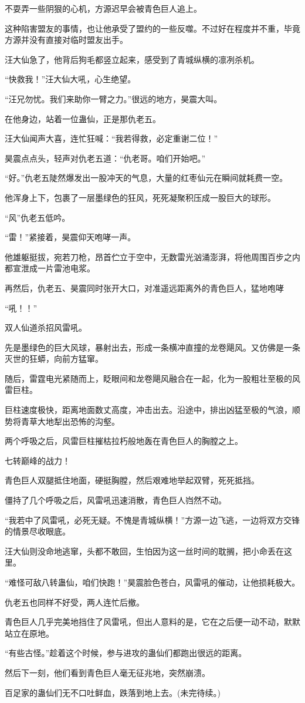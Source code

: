 \begin{this_body}
不耍弄一些阴狠的心机，方源迟早会被青色巨人追上。

这种陷害盟友的事情，也让他承受了盟约的一些反噬。不过好在程度并不重，毕竟方源并没有直接对临时盟友出手。

汪大仙急了，他背后狗毛都竖立起来，感受到了青城纵横的凛冽杀机。

“快救我！”汪大仙大吼，心生绝望。

“汪兄勿忧。我们来助你一臂之力。”很远的地方，昊震大叫。

在他身边，站着一位蛊仙，正是那仇老五。

汪大仙闻声大喜，连忙狂喊：“我若得救，必定重谢二位！”

昊震点点头，轻声对仇老五道：“仇老哥。咱们开始吧。”

“好。”仇老五陡然爆发出一股冲天的气息，大量的红枣仙元在瞬间就耗费一空。

他浑身上下，包裹了一层墨绿色的狂风，死死凝聚积压成一股巨大的球形。

“风”仇老五低吟。

“雷！”紧接着，昊震仰天咆哮一声。

他雄躯挺拔，宛若刀枪，昂首伫立于空中，无数雷光汹涌澎湃，将他周围百步之内都宣泄成一片雷池电浆。

再然后，仇老五、昊震同时张开大口，对准遥远距离外的青色巨人，猛地咆哮

“吼！！”

双人仙道杀招风雷吼。

先是墨绿色的巨大风球，暴射出去，形成一条横冲直撞的龙卷飓风。又仿佛是一条灭世的狂蟒，向前方猛窜。

随后，雷霆电光紧随而上，眨眼间和龙卷飓风融合在一起，化为一股粗壮至极的风雷巨柱。

巨柱速度极快，距离地面数丈高度，冲击出去。沿途中，排出凶猛至极的气浪，顺势将青草大地犁出恐怖的沟壑。

两个呼吸之后，风雷巨柱摧枯拉朽般地轰在青色巨人的胸膛之上。

七转巅峰的战力！

青色巨人双腿抵住地面，硬挺胸膛，然后艰难地举起双臂，死死抵挡。

僵持了几个呼吸之后，风雷吼迅速消散，青色巨人岿然不动。

“我若中了风雷吼，必死无疑。不愧是青城纵横！”方源一边飞逃，一边将双方交锋的情景尽收眼底。

汪大仙则没命地逃窜，头都不敢回，生怕因为这一丝时间的耽搁，把小命丢在这里。

“难怪可敌八转蛊仙，咱们快跑！”昊震脸色苍白，风雷吼的催动，让他损耗极大。

仇老五也同样不好受，两人连忙后撤。

青色巨人几乎完美地挡住了风雷吼，但出人意料的是，它在之后便一动不动，默默站立在原地。

“有些古怪。”趁着这个时候，参与进攻的蛊仙们都跑出很远的距离。

然后下一刻，他们看到青色巨人毫无征兆地，突然崩溃。

百足家的蛊仙们无不口吐鲜血，跌落到地上去。(未完待续。)

\end{this_body}

